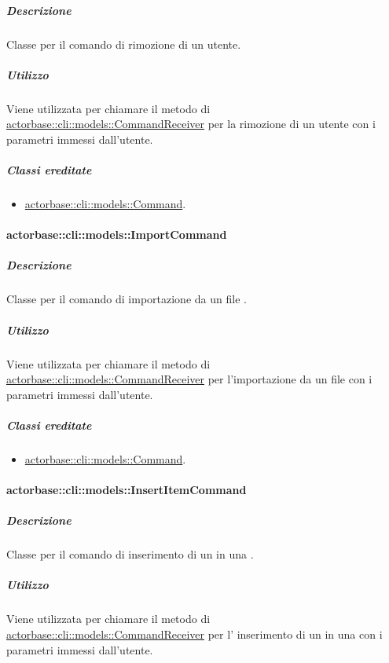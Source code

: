 \documentclass{scalatekids-article}
\begin{document}
\subparagraph{Descrizione}

Classe per il comando di rimozione di un utente.

\subparagraph{Utilizzo}

Viene utilizzata per chiamare il metodo di
\hyperref[sec:actorbase::cli::models::CommandReceiver]{actorbase::cli::models::CommandReceiver} per la rimozione di un utente con i
parametri immessi dall'utente.

\subparagraph{Classi ereditate}

\begin{itemize}
\item \hyperref[sec:actorbase::cli::models::Command]{actorbase::cli::models::Command}.
\end{itemize}

\paragraph{actorbase::cli::models::ImportCommand}
\label{sec:actorbase::cli::models::ImportCommand}

\subparagraph{Descrizione}

Classe per il comando di importazione da un file .

\subparagraph{Utilizzo}

Viene utilizzata per chiamare il metodo di
\hyperref[sec:actorbase::cli::models::CommandReceiver]{actorbase::cli::models::CommandReceiver} per l'importazione da un file
 con i parametri immessi dall'utente.

\subparagraph{Classi ereditate}

\begin{itemize}
\item \hyperref[sec:actorbase::cli::models::Command]{actorbase::cli::models::Command}.
\end{itemize}

\paragraph{actorbase::cli::models::InsertItemCommand}
\label{sec:actorbase::cli::models::InsertItemCommand}

\subparagraph{Descrizione}

Classe per il comando di inserimento di un  in una
.

\subparagraph{Utilizzo}

Viene utilizzata per chiamare il metodo di \hyperref[sec:actorbase::cli::models::CommandReceiver]{actorbase::cli::models::CommandReceiver} per l' inserimento di un  in una  con i parametri immessi dall'utente.
\end{document}
